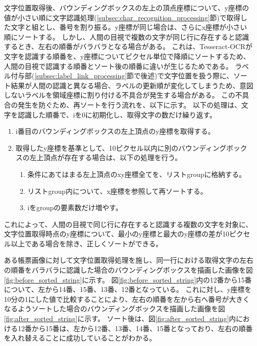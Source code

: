 文字位置取得後、バウンディングボックスの左上の頂点座標について、y座標の値が小さい順に文字認識処理(\ref{subsec:char_recognition_processing}節)で取得した文字と組とし、番号を割り振る。y座標が同じ場合は、さらにx座標が小さい順にソートする。
しかし、人間の目視で複数の文字が同じ行に存在すると認識するとき、左右の順番がバラバラとなる場合がある。
これは、Tesseract-OCRが文字を認識する順番を、y座標についてピクセル単位で降順にソートするため、人間の目視で認識する順番とソート後の順番に違いが生じるためである。
ラベル付与部(\ref{subsec:label_link_processing}節で後述)で文字位置を扱う際に、ソート結果が人間の認識と異なる場合、ラベルの更新順が変化してしまうため、意図しないラベルを領域座標に割り付ける不具合が発生する場合がある。
この不具合の発生を防ぐため、再ソートを行う流れを、以下に示す。
以下の処理は、文字を認識した順番で、iを0に初期化し、取得文字の数だけ繰り返す。

\begin{enumerate}
    \item i番目のバウンディングボックスの左上頂点のy座標を取得する。
    \item 取得したy座標を基準として、10ピクセル以内に別のバウンディングボックスの左上頂点が存在する場合は、以下の処理を行う。
    \begin{enumerate}
        \item 条件にあてはまる左上頂点のxy座標全てを、リストgroupに格納する。
        \item リストgroup内について、x座標を参照して再ソートする。
        \item iをgroupの要素数だけ増やす。
    \end{enumerate}
\end{enumerate}

これによって、人間の目視で同じ行に存在すると認識する複数の文字を対象に、文字位置取得時点のy座標について、最小のy座標と最大のy座標の差が10ピクセル以上である場合を除き、正しくソートができる。

ある帳票画像に対して文字位置取得処理を施し、同一行における取得文字の左右の順番をバラバラに認識した場合のバウンディングボックスを描画した画像を図\ref{fig:before_sorted_string}に示す。
図\ref{fig:before_sorted_string}内の12番から15番について、左から14番、15番、13番、12番となっている。
これに対し、y座標を10分の1にした値で比較することにより、左右の順番を左から右へ番号が大きくなるようソートした場合のバウンディングボックスを描画した画像を図\ref{fig:after_sorted_string}に示す。
ソート後は、図\ref{fig:after_sorted_string}内における12番から15番は、左から12番、13番、14番、15番となっており、左右の順番を入れ替えることに成功していることがわかる。

